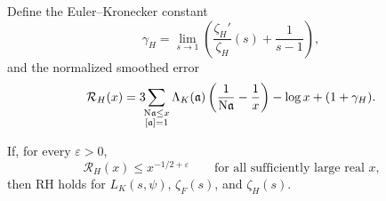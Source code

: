 Define the Euler--Kronecker constant
\[
\gamma_H=\lim_{s\to1}\left(\frac{\zeta_H'}{\zeta_H}(s)+\frac1{s-1}\right),
\]
and the normalized smoothed error
\begin{equation}\label{eq:RHprincipal}
\mathcal R_H(x)=
3\!\!\sum_{\substack{\mathrm{N}\mathfrak a\le x\\{}[\mathfrak a]=1}}
\Lambda_K(\mathfrak a)
\left(\frac1{\mathrm{N}\mathfrak a}-\frac1x\right)
-\log x+(1+\gamma_H).
\end{equation}

\begin{theorem}\label{thm:principal}
If, for every \(\varepsilon>0\),
\begin{equation}\label{eq:missing}
\mathcal R_H(x)\le x^{-1/2+\varepsilon}
\qquad\text{for all sufficiently large real \(x\),}
\end{equation}
then RH holds for \(L_K(s,\psi)\), \(\zeta_F(s)\), and \(\zeta_H(s)\).
\end{theorem}


